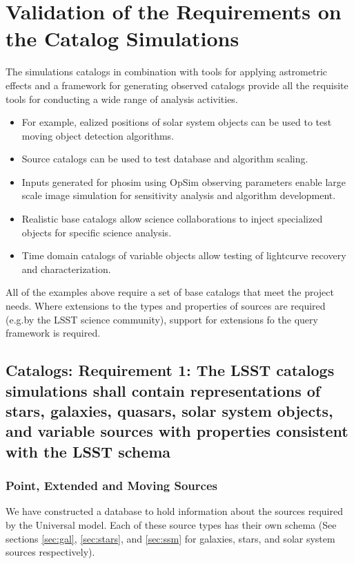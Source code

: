 \documentclass[]{article}
\begin{document}
{\section{Validation of the Requirements on the Catalog Simulations}
The simulations catalogs in combination with tools for applying astrometric effects and a 
framework for generating observed catalogs provide all the requisite tools for conducting a 
wide range of analysis activities.
\begin{itemize}
\item For example, ealized positions of solar system objects can be used to test moving object detection algorithms.
\item Source catalogs can be used to test database and algorithm scaling.
\item Inputs generated for phosim using OpSim observing parameters enable large scale image simulation
for sensitivity analysis and algorithm development.
\item Realistic base catalogs allow science collaborations to inject specialized objects for specific science
analysis.
\item Time domain catalogs of variable objects allow testing of lightcurve recovery and characterization.
\end{itemize}

All of the examples above require a set of base catalogs that meet the project needs.  Where extensions to the types and
properties of sources are required (e.g.by the LSST science community), support for extensions fo the query 
framework is required.  

\subsection{Catalogs: Requirement 1: The LSST catalogs simulations
  shall contain representations of stars, galaxies, quasars, solar
  system objects, and variable sources with properties consistent with the LSST schema}

\subsubsection{Point, Extended and Moving Sources}
We have constructed a database to hold information about the sources required by the Universal model.
Each of these source types has their own schema (See sections \ref{sec:gal}, \ref{sec:stars}, and \ref{sec:ssm} for galaxies, stars, and solar system sources respectively).

}
\end{document}
